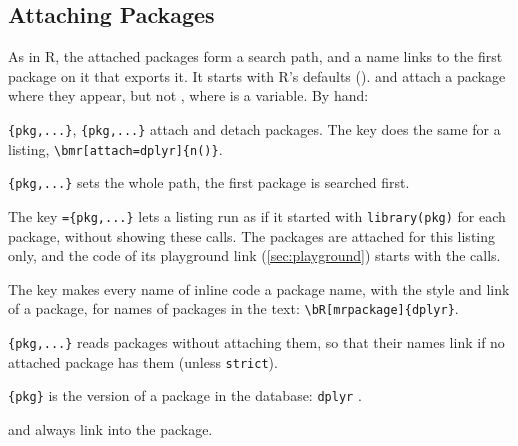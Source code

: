 \documentclass[10pt,DIV=12]{scrartcl}
\let\TT\texttt
\newcommand\code{\lstinline[language=lLatex,language addons=latex,basicstyle=\ttfamily,columns=flexible,keepspaces]}
\begin{document}
\subsection{Attaching Packages}
As in R, the attached packages form a search path, and a name links to the first package on it
that exports it. It starts with R's defaults ().  and
 attach a package where they appear, but not ,
where  is a variable. By hand:
\begin{description}
\item {}\TT{\{pkg,...\}}, \TT{\{pkg,...\}} attach and detach packages.
  The key  does the same for a listing, \code|\bmr[attach=dplyr]{n()}|.
\item {}\TT{\{pkg,...\}} sets the whole path, the first package is searched first.
\item The key \TT{=\{pkg,...\}} lets a listing run as if it started with
  \code|library(pkg)| for each package, without showing these calls. The packages are attached for this
  listing only, and the code of its playground link (\cref{sec:playground}) starts with the calls.
\item The key  makes every name of inline code a package name, with the style and link
  of a package, for names of packages in the text: \code|\bR[mrpackage]{dplyr}|.
\item {}\TT{\{pkg,...\}} reads packages without attaching them, so that their
  names link if no attached package has them (unless \TT{strict}).
\item {}\TT{\{pkg\}} is the version of a package in the database:
  \TT{dplyr} .
\end{description}
 and  always link into the package.
\end{document}
